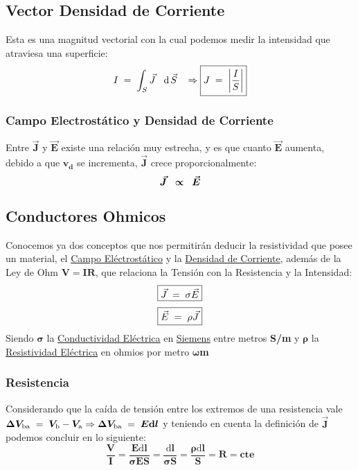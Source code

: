 \subsection{Vector Densidad de Corriente}
 Esta es una magnitud vectorial con la cual podemos medir la intensidad que atraviesa una superficie:
\[
        I \hspace{1mm} = \hspace{1mm} \int_{S} \vec{J}\hspace{3mm}\mathrm{d}\hspace{.5mm}\vec{S}\hspace{3mm}\Rightarrow  \boxed{J\hspace{1mm} = \hspace{1mm} \left | \frac{I}{S} \right |}
\]
\subsubsection{Campo Electrostático y Densidad de Corriente}
 Entre \(\bm{\vec{J}}\) y \(\bm{\vec{E}}\) existe una relación muy estrecha, y es que cuanto \(\bm{\vec{E}}\) aumenta, debido a que \(\bm{v_d}\) se incrementa, \(\bm{\vec{J}}\) crece proporcionalmente:
\[
        \bm{\vec{J}} \hspace{2mm} \bm{\propto} \hspace{2mm} \bm{\vec{E}}
\]
\subsection{Conductores Ohmicos}
 Conocemos ya dos conceptos que nos permitirán deducir la resistividad que posee un material, el \underline{Campo Eléctrostático} y la \underline{Densidad de Corriente}, además de la Ley de Ohm \(\bm{V = IR}\), que relaciona la Tensión con la Resistencia y la Intensidad:
\[
        \boxed{\vec{J} \hspace{1mm} = \hspace{1mm} \sigma \vec{E}}
\]
\[
        \boxed{\vec{E} \hspace{1mm} = \hspace{1mm} \rho \vec{J}}
\]
Siendo \(\bm{\sigma}\) la \underline{Conductividad Eléctrica} en \underline{Siemens} entre metros \textbf{S/m} y \(\bm{\rho}\) la \underline{Resistividad Eléctrica} en ohmios por metro \(\bm{\omega}\)\textbf{m}
\subsubsection{Resistencia}
 Considerando que la caída de tensión entre los extremos de una resistencia vale \\ \(\bm{\Delta V_{\textnormal{ba}}} \hspace{1mm}= \hspace{1mm} \bm{V_\textnormal{b}} -\bm{V_\textnormal{a}}  \Rightarrow \bm{\Delta V_{\textnormal{ba}}}\hspace{1mm}= \hspace{1mm} \bm{E \mathrm{d}l}\) y teniendo en cuenta la definición de \(\bm{\vec{J}}\) podemos concluir en lo siguiente:
\[
        \boxed{\bm{\frac{V}{I} = \frac{E\mathrm{d}l}{\sigma E S} = \frac{\mathrm{d}l}{\sigma S} = \frac{\rho \mathrm{d}l}{S} = R = cte}}
\]
